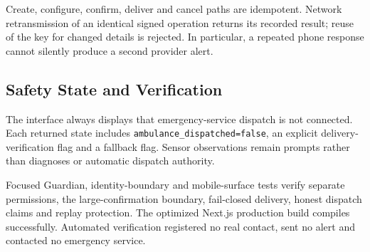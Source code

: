 Create, configure, confirm, deliver and cancel paths are idempotent.  Network retransmission of an
identical signed operation returns its recorded result; reuse of the key for changed details is
rejected.  In particular, a repeated phone response cannot silently produce a second provider
alert.

\subsection{Safety State and Verification}

The interface always displays that emergency-service dispatch is not connected.  Each returned
state includes \texttt{ambulance\_dispatched=false}, an explicit delivery-verification flag and a
fallback flag.  Sensor observations remain prompts rather than diagnoses or automatic dispatch
authority.

Focused Guardian, identity-boundary and mobile-surface tests verify separate permissions, the
large-confirmation boundary, fail-closed delivery, honest dispatch claims and replay protection.
The optimized Next.js production build compiles successfully.  Automated verification registered
no real contact, sent no alert and contacted no emergency service.

\endgroup

